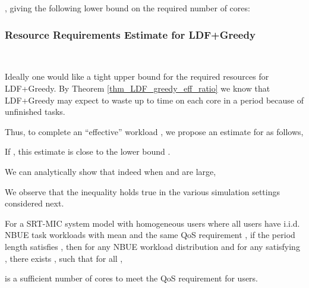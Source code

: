 \documentclass[prodmode,acmtompecs]{acmsmall}
\newcommand{\myComments}[1]{}
\newif\ifinfocom
\newif\iftompecsonly
\newif\iftompecsextended
\newif\ifdissertation
\newcommand{\infocomStart}{\ifinfocom \myComments{Infocom: }}
\newcommand{\tompecsonlyStart}{\iftompecsonly \myComments{TOMPECS only version: }}
\newcommand{\tompecsextendedStart}{\iftompecsextended  \myComments{TOMPECS extended version: }}
\newcommand{\dissertationStart}{\ifdissertation  \myComments{Dissertation version: }}
\newcommand{\commentEnd}{\myComments{End}}
\begin{document}
, giving the following lower bound on the required number of cores: 


\dissertationStart
If we ignore the ceilings, 

gives us a {\em upper bound} for the possible resource savings compared with reservation-based static sharing, i.e., the percentage of cores we can save by devising the best possible non-clairvoyant resource allocation policies. Clearly, this depends on the workload distributions and the requirement vector . We will see in the simulation section that the proposed approaches can achieve this upper bound in some scenarios. 
\commentEnd\fi

\subsubsection{Resource Requirements Estimate for LDF+Greedy}
~

\dissertationStart
After giving a the lower bound  for the required number of cores for all non-clairvoyant designs, we want to explore the required  for the LDF+Greedy policy. 
\commentEnd\fi
Ideally one would like a tight upper bound for the required resources  for LDF+Greedy. 
By Theorem \ref{thm_LDF_greedy_eff_ratio} we know that LDF+Greedy may expect to waste up to  time on each core in a period because of unfinished tasks. 
\dissertationStart
Therefore, the ``effective'' time for each core in one period is at least . 
\commentEnd\fi
Thus, to complete an ``effective'' workload , we propose an estimate for  as follows,

If , this estimate is close to the lower bound . 


\infocomStart
One can analytically show that indeed  when  and  are large, see the extended version of this paper \cite{EXT}. 
\commentEnd\fi
We can analytically show that indeed  when  and  are large, 
\tompecsonlyStart
see the extended version of this paper \cite{EXT}. 
\commentEnd\fi
\tompecsextendedStart
see the proposition as follows. 
\commentEnd\fi
We observe that the inequality holds true in the various simulation settings considered next. 

\tompecsextendedStart
\begin{proposition}
\label{proposition_m_est_for_large_system}
For a SRT-MIC  system model with homogeneous users where all users have i.i.d. NBUE task workloads with mean  and the same QoS requirement , if the period length satisfies , then for any NBUE workload distribution and for any  satisfying , there exists , such that for all , 

is a sufficient number of cores to meet the QoS requirement for  users. 
\end{proposition}
\end{document}
